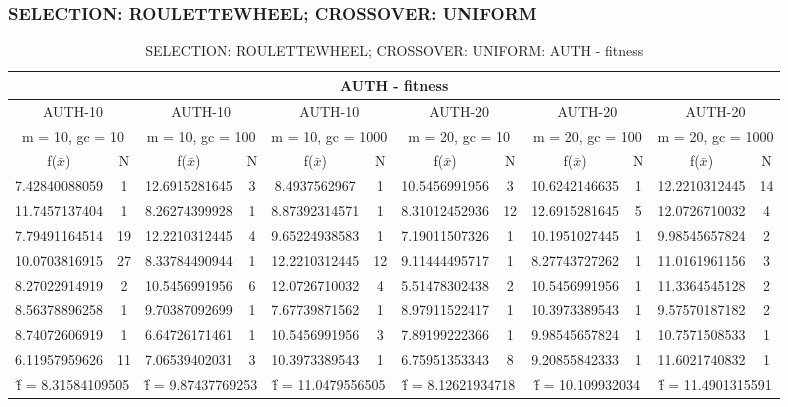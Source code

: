 \subsubsection{SELECTION: ROULETTEWHEEL; CROSSOVER: UNIFORM}
\begin{table}[H]
	\centering
	\caption{SELECTION: ROULETTEWHEEL; CROSSOVER: UNIFORM: AUTH - fitness}
	\begin{adjustbox}{width=1\textwidth}
		\begin{tabular}{ |c|c||c|c||c|c||c|c||c|c||c|c| }
			\hline
			\multicolumn{12}{|c|}{AUTH - fitness} \\
			\hline
			\multicolumn{2}{|c||}{AUTH-10} & \multicolumn{2}{c||}{AUTH-10} & \multicolumn{2}{c||}{AUTH-10} & \multicolumn{2}{c||}{AUTH-20} & \multicolumn{2}{c||}{AUTH-20} & \multicolumn{2}{c|}{AUTH-20}\\
			\hline
			\multicolumn{2}{|c||}{m = 10, gc = 10} & \multicolumn{2}{c||}{m = 10, gc = 100} & \multicolumn{2}{c||}{m = 10, gc = 1000} & \multicolumn{2}{c||}{m = 20, gc = 10} & \multicolumn{2}{c||}{m = 20, gc = 100} & \multicolumn{2}{c|}{m = 20, gc = 1000}\\
			\hline
			f($\bar{x}$) & N & f($\bar{x}$) & N & f($\bar{x}$) & N & f($\bar{x}$) & N & f($\bar{x}$) & N & f($\bar{x}$) & N\\
			\hline
			\hline
			7.42840088059 & 1 & 12.6915281645 & 3 & 8.4937562967 & 1 & 10.5456991956 & 3 & 10.6242146635 & 1 & 12.2210312445 & 14\\
			11.7457137404 & 1 & 8.26274399928 & 1 & 8.87392314571 & 1 & 8.31012452936 & 12 & 12.6915281645 & 5 & 12.0726710032 & 4\\
			7.79491164514 & 19 & 12.2210312445 & 4 & 9.65224938583 & 1 & 7.19011507326 & 1 & 10.1951027445 & 1 & 9.98545657824 & 2\\
			10.0703816915 & 27 & 8.33784490944 & 1 & 12.2210312445 & 12 & 9.11444495717 & 1 & 8.27743727262 & 1 & 11.0161961156 & 3\\
			8.27022914919 & 2 & 10.5456991956 & 6 & 12.0726710032 & 4 & 5.51478302438 & 2 & 10.5456991956 & 1 & 11.3364545128 & 2\\
			8.56378896258 & 1 & 9.70387092699 & 1 & 7.67739871562 & 1 & 8.97911522417 & 1 & 10.3973389543 & 1 & 9.57570187182 & 2\\
			8.74072606919 & 1 & 6.64726171461 & 1 & 10.5456991956 & 3 & 7.89199222366 & 1 & 9.98545657824 & 1 & 10.7571508533 & 1\\
			6.11957959626 & 11 & 7.06539402031 & 3 & 10.3973389543 & 1 & 6.75951353343 & 8 & 9.20855842333 & 1 & 11.6021740832 & 1\\
			\hline
			\multicolumn{2}{|c||}{\^{f} = 8.31584109505} & \multicolumn{2}{c||}{\^{f} = 9.87437769253} & \multicolumn{2}{c||}{\^{f} = 11.0479556505} & \multicolumn{2}{c||}{\^{f} = 8.12621934718} & \multicolumn{2}{c||}{\^{f} = 10.109932034} & \multicolumn{2}{c|}{\^{f} = 11.4901315591}\\
			\hline
		\end{tabular}
	\end{adjustbox}
\end{table}
